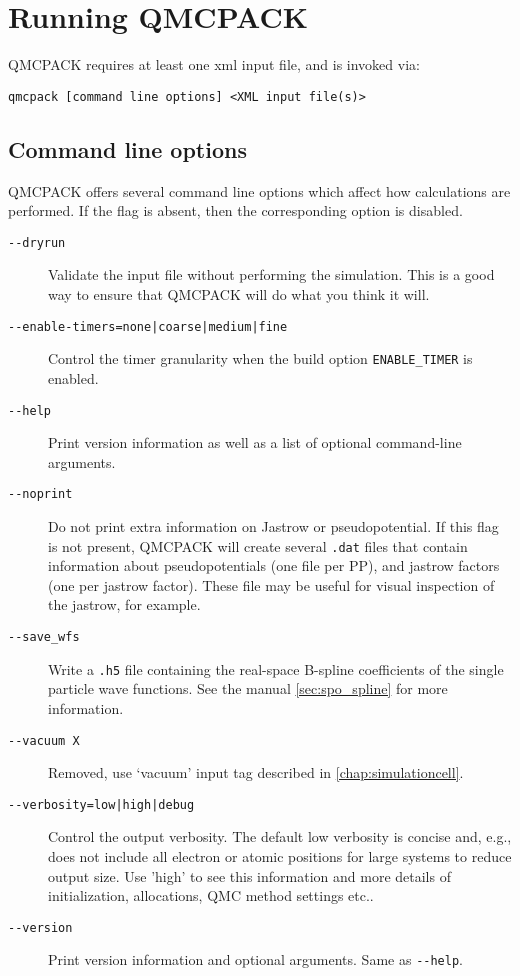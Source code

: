 \chapter{Running QMCPACK}
\label{chap:running}

QMCPACK requires at least one xml input file, and is invoked via:

{\texttt{qmcpack [command line options] <XML input file(s)>}}

\section{Command line options}
\label{sec:commandline}
QMCPACK offers several command line options which affect how calculations
are performed. If the flag is absent, then the corresponding
option is disabled.

\begin{description}
\item[\texttt{-{}-dryrun}]{ Validate the input file without performing the simulation.
  This is a good way to ensure that QMCPACK will do what you think it will. }
\item[\texttt{-{}-enable-timers=none|coarse|medium|fine}]{ Control the timer granularity
  when the build option \texttt{ENABLE\_TIMER} is enabled. }
\item[\texttt{-{}-help}]{ Print version information as well as a list of optional
  command-line arguments. }
\item[\texttt{-{}-noprint}]{ Do not print extra information on Jastrow or pseudopotential.
  If this flag is not present, QMCPACK will create several \texttt{.dat} files
  that contain information about pseudopotentials (one file per PP), and jastrow
  factors (one per jastrow factor). These file may be useful for visual inspection
  of the jastrow, for example. }
\item[\texttt{-{}-save\_wfs}]{ Write a \texttt{.h5} file containing the real-space B-spline
  coefficients of the single particle wave functions. See the manual
  \ref{sec:spo_spline} for more information.}
\item[\texttt{-{}-vacuum X}]{Removed, use `vacuum' input tag described in \ref{chap:simulationcell}. }
\item[\texttt{-{}-verbosity=low|high|debug}]{ Control the output verbosity. The default low verbosity is concise and, e.g., does not include all electron or atomic positions for large systems to reduce output size. Use 'high' to see this information and more details of initialization, allocations, QMC method settings etc.. }
\item[\texttt{-{}-version}]{ Print version information and optional arguments.
  Same as \texttt{-{}-help}. }
\end{description}


